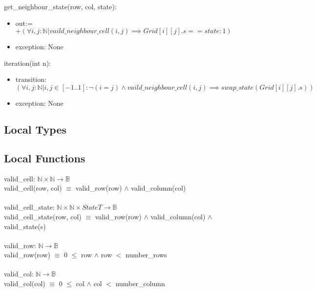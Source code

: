 \documentclass[12pt]{article}
\begin{document}
\noindent get\_neighbour\_state(row, col, state):
\begin{itemize}
\item out:= $+ (\forall i , j : \mathbb{N}|vaild\_neighbour\_cell(i,j) \implies  Grid[i][j].s == state: 1)$
\item exception: None
\end{itemize}

\noindent iteration(int n):
\begin{itemize}
\item transition: $(\forall i , j : \mathbb{N}| i, j \in [-1..1]: \lnot(i = j) \land vaild\_neighbour\_cell(i,j) \implies  swap\_state(Grid[i][j].s))$
\item exception: None
\end{itemize}





\subsection*{Local Types}


\subsection*{Local Functions}

valid\_cell: $ \mathbb{N} \times \mathbb{N} \rightarrow \mathbb{B}$ \\
valid\_cell(row, col) $\equiv$ valid\_row(row) $\land$ valid\_column(col) \\\\

\noindent valid\_cell\_state: $\mathbb{N} \times \mathbb{N} \times StateT \rightarrow \mathbb{B}$ \\
valid\_cell\_state(row, col) $\equiv$ valid\_row(row) $\land$ valid\_column(col) $\land$ valid\_state(s)\\\\

\noindent valid\_row: $\mathbb{N} \rightarrow \mathbb{B}$ \\
valid\_row(row) $\equiv$ 0 $\leq$ row $\land$ row $<$ number\_rows\\\\

\noindent valid\_col: $\mathbb{N} \rightarrow \mathbb{B}$ \\
valid\_col(col) $\equiv$ 0 $\leq$ col $\land$ col $<$ number\_column\\\\
\end{document}
